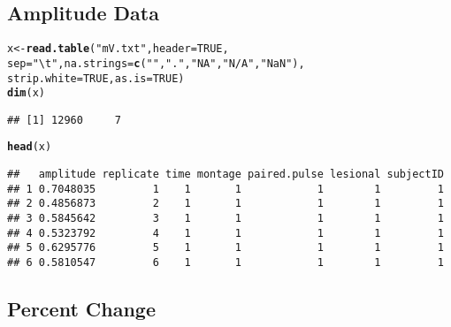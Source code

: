 \documentclass[11pt]{article}\usepackage[]{graphicx}\usepackage[]{color}
\makeatletter
\newcommand{\hlnum}[1]{\textcolor[rgb]{0.686,0.059,0.569}{#1}}%
\newcommand{\hlstr}[1]{\textcolor[rgb]{0.192,0.494,0.8}{#1}}%
\newcommand{\hlstd}[1]{\textcolor[rgb]{0.345,0.345,0.345}{#1}}%
\newcommand{\hlkwb}[1]{\textcolor[rgb]{0.69,0.353,0.396}{#1}}%
\newcommand{\hlkwc}[1]{\textcolor[rgb]{0.333,0.667,0.333}{#1}}%
\newcommand{\hlkwd}[1]{\textcolor[rgb]{0.737,0.353,0.396}{\textbf{#1}}}%
\newenvironment{kframe}{%
 \def\at@end@of@kframe{}%
 \ifinner\ifhmode%
  \def\at@end@of@kframe{\end{minipage}}%
  \begin{minipage}{\columnwidth}%
 \fi\fi%
 \def\FrameCommand##1{\hskip\@totalleftmargin \hskip-\fboxsep
 \colorbox{shadecolor}{##1}\hskip-\fboxsep
     \hskip-\linewidth \hskip-\@totalleftmargin \hskip\columnwidth}%
 \MakeFramed {\advance\hsize-\width
   \@totalleftmargin\z@ \linewidth\hsize
   \@setminipage}}%
 {\par\unskip\endMakeFramed%
 \at@end@of@kframe}
\newenvironment{knitrout}{}{} %
\makeatother
\begin{document}
\subsection{Amplitude Data}

\begin{knitrout}
\color{fgcolor}\begin{kframe}
\begin{alltt}
\hlstd{x}\hlkwb{<-}\hlkwd{read.table}\hlstd{(}\hlstr{"mV.txt"}\hlstd{,}\hlkwc{header}\hlstd{=}\hlnum{TRUE}\hlstd{,}
              \hlkwc{sep}\hlstd{=}\hlstr{"\textbackslash{}t"}\hlstd{,}\hlkwc{na.strings}\hlstd{=}\hlkwd{c}\hlstd{(}\hlstr{""}\hlstd{,}\hlstr{"."}\hlstd{,}\hlstr{"NA"}\hlstd{,}\hlstr{"N/A"}\hlstd{,}\hlstr{"NaN"}\hlstd{),}
              \hlkwc{strip.white}\hlstd{=}\hlnum{TRUE}\hlstd{,}\hlkwc{as.is}\hlstd{=}\hlnum{TRUE}\hlstd{)}
\hlkwd{dim}\hlstd{(x)}
\end{alltt}
\begin{verbatim}
## [1] 12960     7
\end{verbatim}
\begin{alltt}
\hlkwd{head}\hlstd{(x)}
\end{alltt}
\begin{verbatim}
##   amplitude replicate time montage paired.pulse lesional subjectID
## 1 0.7048035         1    1       1            1        1         1
## 2 0.4856873         2    1       1            1        1         1
## 3 0.5845642         3    1       1            1        1         1
## 4 0.5323792         4    1       1            1        1         1
## 5 0.6295776         5    1       1            1        1         1
## 6 0.5810547         6    1       1            1        1         1
\end{verbatim}
\end{kframe}
\end{knitrout}

\subsection{Percent Change}
\end{document}
